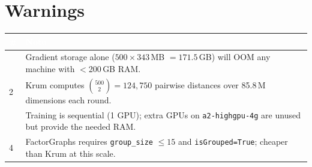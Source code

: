 \documentclass[11pt,a4paper]{article}
\begin{document}
\section*{Warnings}

\noindent
\begin{center}
\renewcommand{\arraystretch}{1.25}
\begin{tabular}{
  >{\centering\arraybackslash}p{0.6cm}
  >{\raggedright\arraybackslash}p{13cm}}
\toprule
\rowcolor{hdrblue}
\textcolor{white}{\textbf{\#}} &
\textcolor{white}{\textbf{Note}} \\
\midrule
1 & Gradient storage alone ($500 \times 343$\,MB $= 171.5$\,GB) will OOM any machine with $<$200\,GB RAM. \\
\rowcolor{rowgray}
2 & Krum computes $\binom{500}{2} = 124{,}750$ pairwise distances over 85.8\,M dimensions each round. \\
3 & Training is sequential (1 GPU); extra GPUs on \texttt{a2-highgpu-4g} are unused but provide the needed RAM. \\
\rowcolor{rowgray}
4 & FactorGraphs requires \texttt{group\_size} $\leq 15$ and \texttt{isGrouped=True}; cheaper than Krum at this scale. \\
\bottomrule
\end{tabular}
\end{center}
\end{document}
